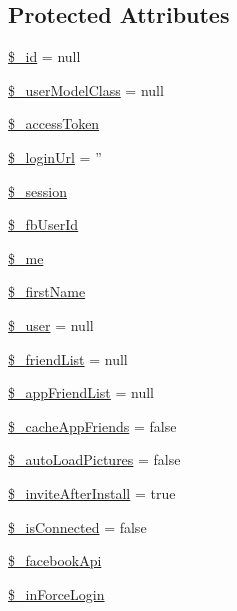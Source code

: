\subsection*{Protected Attributes}
\begin{DoxyCompactItemize}
\item 
\hyperlink{classCPSFacebookUserIdentity_a64da16c4a1c7b2dc6784f6ef26341ed7}{\$\_\-id} = null
\item 
\hyperlink{classCPSFacebookUserIdentity_a86b918c4cc90bae631b0f42b136d3a3c}{\$\_\-userModelClass} = null
\item 
\hyperlink{classCPSFacebookUserIdentity_a4baf52b9d7a98e5d1354c0184a030233}{\$\_\-accessToken}
\item 
\hyperlink{classCPSFacebookUserIdentity_ad0039d9d92917bd2c7e46c93d8562b8b}{\$\_\-loginUrl} = ''
\item 
\hyperlink{classCPSFacebookUserIdentity_ad0641deaf4d314f034a134efaa6fbff0}{\$\_\-session}
\item 
\hyperlink{classCPSFacebookUserIdentity_a19e04e69bd6cde6129a45de979954cfa}{\$\_\-fbUserId}
\item 
\hyperlink{classCPSFacebookUserIdentity_a45e53d351918dc7cad7136ff44e1724b}{\$\_\-me}
\item 
\hyperlink{classCPSFacebookUserIdentity_ae47bb90ba7f0f5de161e554290d3b5b8}{\$\_\-firstName}
\item 
\hyperlink{classCPSFacebookUserIdentity_a5df5982b9dadc74df05081972cd67fdf}{\$\_\-user} = null
\item 
\hyperlink{classCPSFacebookUserIdentity_a93380830cda99a4927d3507251a12e32}{\$\_\-friendList} = null
\item 
\hyperlink{classCPSFacebookUserIdentity_a69ad1b664bbcbc06fbaeb07133568469}{\$\_\-appFriendList} = null
\item 
\hyperlink{classCPSFacebookUserIdentity_a1ef3e76667a47cb12fabf1c9c79f17ff}{\$\_\-cacheAppFriends} = false
\item 
\hyperlink{classCPSFacebookUserIdentity_acbda478de6e55a60d9716bd3d101e40d}{\$\_\-autoLoadPictures} = false
\item 
\hyperlink{classCPSFacebookUserIdentity_a06deb2baf54257cacaf8cbc83f9bf1a1}{\$\_\-inviteAfterInstall} = true
\item 
\hyperlink{classCPSFacebookUserIdentity_a3fb00b079c40b68e2ce79a0c27aad663}{\$\_\-isConnected} = false
\item 
\hyperlink{classCPSFacebookUserIdentity_a2f481ea63815c4c7e8c6dad8b4d839ec}{\$\_\-facebookApi}
\item 
\hyperlink{classCPSFacebookUserIdentity_a425e3b02d08adda9a06498d8e0f5714c}{\$\_\-inForceLogin}
\end{DoxyCompactItemize}



